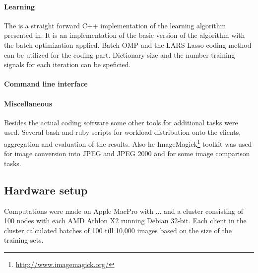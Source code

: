 \paragraph{Learning}
The \trainDL is a straight forward C++ implementation of the
learning algorithm presented in\cite{Mairal2010}. It is an implementation of the
basic version of the algorithm with the batch optimization applied. Batch-OMP
and the LARS-Lasso coding method can be utilized for the coding part.
Dictionary size and the number training signals for each iteration can be
speficied.


\paragraph{Command line interface}
%

\paragraph{Miscellaneous}
Besides the actual coding software some other tools for
additional tasks were used. Several bash and ruby scripts for workload
distribution onto the clients, aggregation and evaluation of the results.
Also he ImageMagick\footnote{\url{http://www.imagemagick.org/}} toolkit was used
for image conversion into JPEG and JPEG 2000 and for some image comparison
tasks.

\subsection*{Hardware setup}
Computations were made on Apple MacPro with ... 
and a cluster consisting of 100 nodes with each AMD Athlon X2  running Debian 32-bit. Each client in the cluster calculated batches of
100 till 10,000 images based on the size of the training sets.